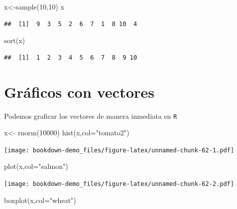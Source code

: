 \documentclass[
]{book}
\newenvironment{Shaded}{\begin{snugshade}}{\end{snugshade}}
\newcommand{\AttributeTok}[1]{\textcolor[rgb]{0.77,0.63,0.00}{#1}}
\newcommand{\DecValTok}[1]{\textcolor[rgb]{0.00,0.00,0.81}{#1}}
\newcommand{\FunctionTok}[1]{\textcolor[rgb]{0.00,0.00,0.00}{#1}}
\newcommand{\NormalTok}[1]{#1}
\newcommand{\OtherTok}[1]{\textcolor[rgb]{0.56,0.35,0.01}{#1}}
\newcommand{\StringTok}[1]{\textcolor[rgb]{0.31,0.60,0.02}{#1}}
\begin{document}
\begin{Shaded}
\begin{Highlighting}[]
\NormalTok{x}\OtherTok{\textless{}{-}}\FunctionTok{sample}\NormalTok{(}\DecValTok{10}\NormalTok{,}\DecValTok{10}\NormalTok{)}
\NormalTok{x}
\end{Highlighting}
\end{Shaded}

\begin{verbatim}
##  [1]  9  3  5  2  6  7  1  8 10  4
\end{verbatim}

\begin{Shaded}
\begin{Highlighting}[]
\FunctionTok{sort}\NormalTok{(x)}
\end{Highlighting}
\end{Shaded}

\begin{verbatim}
##  [1]  1  2  3  4  5  6  7  8  9 10
\end{verbatim}

\hypertarget{gruxe1ficos-con-vectores}{%
\section{Gráficos con vectores}\label{gruxe1ficos-con-vectores}}

Podemos graficar los vectores de manera inmediata en \texttt{R}

\begin{Shaded}
\begin{Highlighting}[]
\NormalTok{x}\OtherTok{\textless{}{-}} \FunctionTok{rnorm}\NormalTok{(}\DecValTok{10000}\NormalTok{)}
\FunctionTok{hist}\NormalTok{(x,}\AttributeTok{col=}\StringTok{"tomato2"}\NormalTok{)}
\end{Highlighting}
\end{Shaded}

\texttt{[image: bookdown-demo\_files/figure-latex/unnamed-chunk-62-1.pdf]}

\begin{Shaded}
\begin{Highlighting}[]
\FunctionTok{plot}\NormalTok{(x,}\AttributeTok{col=}\StringTok{"salmon"}\NormalTok{)}
\end{Highlighting}
\end{Shaded}

\texttt{[image: bookdown-demo\_files/figure-latex/unnamed-chunk-62-2.pdf]}

\begin{Shaded}
\begin{Highlighting}[]
\FunctionTok{boxplot}\NormalTok{(x,}\AttributeTok{col=}\StringTok{"wheat"}\NormalTok{)}
\end{Highlighting}
\end{Shaded}
\end{document}
